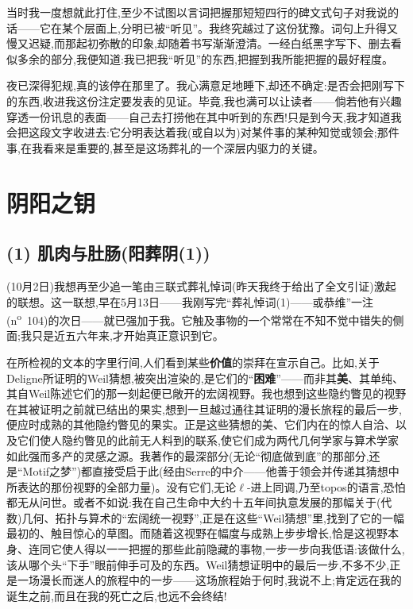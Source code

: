 当时我一度想就此打住,至少不试图以言词把握那短短四行的碑文式句子对我说的话——它在某个层面上,分明已被“听见”。我终究越过了这份犹豫。词句上升得又慢又迟疑,而那起初弥散的印象,却随着书写渐渐澄清。一经白纸黑字写下、删去看似多余的部分,我便知道:我已把我“听见”的东西,把握到我所能把握的最好程度。

夜已深得犯规,真的该停在那里了。我心满意足地睡下,却还不确定:是否会把刚写下的东西,收进我这份注定要发表的见证。毕竟,我也满可以让读者——倘若他有兴趣穿透一份讯息的表面——自己去打捞他在其中听到的东西!只是到今天,我才知道我会把这段文字收进去:它分明表达着我(或自以为)对某件事的某种知觉或领会;那件事,在我看来是重要的,甚至是这场葬礼的一个深层内驱力的关键。

\section{阴阳之钥}
\label{ch18:local:h4}

\subsection{(1) 肌肉与肚肠(阳葬阴(1))}
\label{ch18:local:h5}

\label{ch18:local:n3}

(10月2日)我想再至少追一笔由三联式葬礼悼词(昨天我终于给出了全文引证)激起的联想。这一联想,早在5月13日——我刚写完“葬礼悼词(1)——或恭维”一注(n\textsuperscript{o}~104)的次日——就已强加于我。它触及事物的一个常常在不知不觉中错失的侧面;我只是近五六年来,才开始\dmark{}真正意识到它。

在所检视的文本的字里行间,人们看到某些\textbf{价值}的崇拜在宣示自己。比如,关于Deligne所证明的Weil猜想,被突出渲染的,是它们的“\textbf{困难}”——而非其\textbf{美}、其单纯、其自Weil陈述它们的那一刻起便已敞开的宏阔视野。我也想到这些隐约瞥见的视野在其被证明之前就已结出的果实,想到一旦越过通往其证明的漫长旅程的最后一步,便应时成熟的其他隐约瞥见的果实。正是这些猜想的美、它们内在的惊人自洽、以及它们使人隐约瞥见的此前无人料到的联系,使它们成为两代几何学家与算术学家如此强而多产的灵感之源。我著作的最深部分(无论“彻底做到底”的那部分,还是“Motif之梦”)都直接受启于此(经由Serre的中介——他善于领会并传递其猜想中所表达的那份视野的全部力量)。没有它们,无论$\ell$-进上同调,乃至topos的语言,恐怕都无从问世。或者不如说:我在自己生命中大约十五年间执意发展的那幅关于(代数)几何、拓扑与算术的“宏阔统一视野”,正是在这些“Weil猜想”里,找到了它的一幅最初的、触目惊心的草图。而随着这视野在幅度与成熟上步步增长,恰是这视野本身、连同它使人得以一一把握的那些此前隐藏的事物,一步一步向我低语:该做什么,该从哪个头“下手”眼前伸手可及的东西。Weil猜想证明中的最后一步,不多不少,正是一场漫长而迷人的旅程中的一步——这场旅程始于何时,我说不上;肯定远在我的诞生之前,而且在我的死亡之后,也远不会终结!

